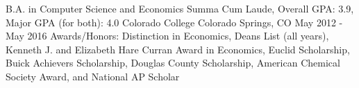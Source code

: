


\begin{cventries}


\cventry
{B.A. in Computer Science and Economics Summa Cum Laude, Overall GPA: 3.9, Major GPA (for both): 4.0} %
{Colorado College} %
{Colorado Springs, CO} %
{May 2012 - May 2016} %
{Awards/Honors: Distinction in Economics, Deans List (all years), Kenneth J. and Elizabeth Hare Curran Award in Economics, Euclid Scholarship, Buick Achievers Scholarship, Douglas County Scholarship, American Chemical Society Award, and National AP Scholar}


\end{cventries}